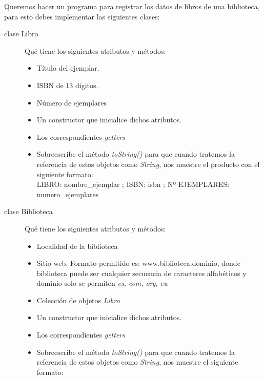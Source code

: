 \documentclass[addpoints,12pt]{exam}
\begin{document}
\begin{center}
\end{center}
\vspace{0.1in}
\begin{questions}
\question Queremos hacer un programa para registrar los datos de libros de una biblioteca, para esto debes implementar las siguientes clases:
\begin{description}
\item[clase Libro] Qué tiene los siguientes atributos y métodos:
\begin{itemize}
\item Título del ejemplar.
\item ISBN de 13 digitos.
\item Número de ejemplares
\item Un constructor que inicialice dichos atributos.
\item Los correspondientes \emph{getters}
\item Sobreescribe el método \emph{toString()} para que cuando tratemos la referencia de estos objetos como \emph{String}, nos muestre el producto con el siguiente formato:\\
LIBRO: nombre\_ejemplar ; ISBN: isbn ; Nº EJEMPLARES: numero\_ejemplares
\end{itemize}
\item[clase Biblioteca] Qué tiene los siguientes atributos y métodos:
\begin{itemize}
\item Localidad de la biblioteca
\item Sitio web. Formato permitido es: www.biblioteca.dominio, donde biblioteca puede ser cualquier secuencia de caracteres alfabéticos y dominio solo se permiten \emph{es, com, org, eu}
\item Colección de objetos \emph{Libro}
\item Un constructor que inicialice dichos atributos.
\item Los correspondientes \emph{getters}
\item Sobreescribe el método \emph{toString()} para que cuando tratemos la referencia de estos objetos como \emph{String}, nos muestre  el siguiente formato:\\

\end{itemize}
\end{description}
\end{questions}
\end{document}
